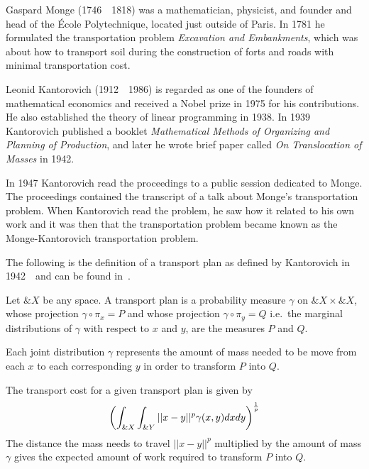 Gaspard Monge (1746~\textendash~1818) was a mathematician, physicist,
and founder and head of the \'Ecole Polytechnique, located just
outside of Paris. In 1781 he formulated the transportation problem
\textit{Excavation and Embankments}, which was about how to transport
soil during the construction of forts and roads with minimal
transportation cost.

Leonid Kantorovich (1912~\textendash~1986) is regarded as one of the
founders of mathematical economics and received a Nobel prize in 1975
for his contributions.  He also established the theory of linear
programming in 1938. In 1939 Kantorovich published a booklet
\textit{Mathematical Methods of Organizing and Planning of
  Production}, and later he wrote brief paper called \textit{On
  Translocation of Masses} in 1942.

In 1947 Kantorovich read the proceedings to a public session dedicated
to Monge. The proceedings contained the transcript of a talk about
Monge's transportation problem. When Kantorovich read the problem, he
saw how it related to his own work and it was then that the
transportation problem became known as the Monge-Kantorovich
transportation problem.

The following is the definition of a transport plan as defined by
Kantorovich in 1942~\cite{ref:kantorovich-1942}~and can be found
in~\cite{ref:vershik-2013}.

\begin{definition}%
  \label{def:transport-plan}
  Let $\&X$ be any space. A \textnormal{\sffamily transport plan} is a
  probability measure $\gamma$ on $\&X \times \&X$, whose projection
  $\gamma \circ \pi_{x} = P$ and whose projection
  $\gamma \circ \pi_{y} = Q$ i.e.\ the marginal distributions of
  $\gamma$ with respect to $x$ and $y$, are the measures $P$ and $Q$.
\end{definition}

\begin{remark}%
  \label{rmrk:mass}
  Each joint distribution $\gamma$ represents the amount of mass
  needed to be move from each $x$ to each corresponding $y$ in order
  to transform $P$ into $Q$.
\end{remark}

\begin{definition}%
  \label{def:transport-cost}
  The \textnormal{\sffamily transport cost} for a given transport plan
  is given by
  \begin{align}%
    \label{eq:expected-work}
    \left(\int_{\&X}\int_{\&Y}||x-y||^p\gamma(x, y)dxdy \right)^{1 \over p}
  \end{align}
  The distance the mass needs to travel $||x-y||^p$ multiplied by the
  amount of mass $\gamma$ gives the expected amount of work
  required to transform $P$ into $Q$.
\end{definition}

